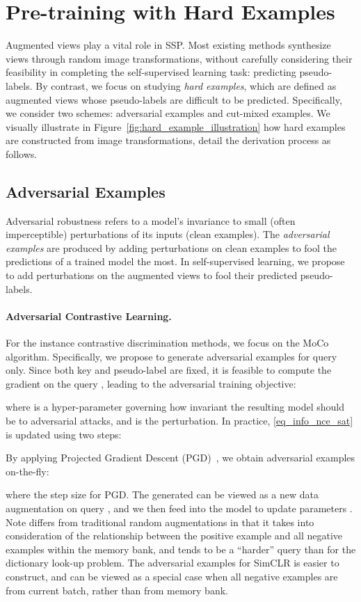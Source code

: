 \documentclass[10pt,twocolumn,letterpaper]{article}
\begin{document}
\section{Pre-training with Hard Examples}
Augmented views  play a vital role in SSP. Most existing methods synthesize views through random image transformations, without carefully considering their feasibility in completing the self-supervised learning task: predicting pseudo-labels. By contrast, we focus on studying {\em hard examples}, which are defined as augmented views  whose pseudo-labels  are difficult to be predicted. Specifically, we consider two schemes: adversarial examples and cut-mixed examples. We visually illustrate in Figure~\ref{fig:hard_example_illustration} how hard examples are constructed from image transformations, detail the derivation process as follows. 

\subsection{Adversarial Examples}
Adversarial robustness refers to a model’s invariance to small (often imperceptible) perturbations of its inputs (\ie clean examples). The {\em adversarial examples} are produced by adding perturbations on clean examples to fool the predictions of a trained model the most. In self-supervised learning,  we propose to add perturbations on the augmented views  to fool their predicted pseudo-labels. 



\paragraph{Adversarial Contrastive Learning.}
For the instance contrastive discrimination methods, we focus on the MoCo algorithm. Specifically, we propose to generate adversarial examples for query  only. Since both key  and pseudo-label  are fixed, it is feasible to compute the gradient on the query , leading to the adversarial training objective:  

where  is a hyper-parameter governing how invariant the resulting model should be to adversarial attacks, 
and  is the perturbation. In practice, \eqref{eq_info_nce_sat} is updated using two steps:  
 
By applying Projected Gradient Descent (PGD)~\cite{goodfellow2014explaining,bubeck2014convex}, we obtain adversarial examples on-the-fly:

where  the step size for PGD.
The generated  can be viewed as a new data augmentation on query , and   we then feed   into the model to update parameters . Note  differs from traditional random augmentations in that it  takes into consideration of the relationship between the positive example  and all negative examples within the memory bank, and tends to be a ``harder'' query than   for the dictionary look-up problem. 
The adversarial examples for SimCLR is easier to construct, and can be viewed as a special case when all negative examples are from current batch, rather than from memory bank.
\end{document}
